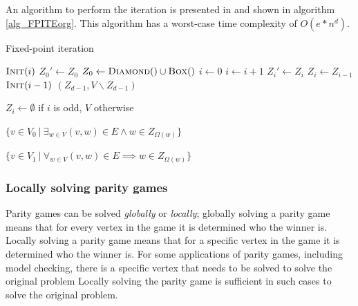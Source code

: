 An algorithm to perform the iteration is presented in \cite{FPITE} and shown in algorithm \ref{alg_FPITEorg}. This algorithm has a worst-case time complexity of $O(e * n ^d)$.
\begin{algorithm}
	\caption{Fixed-point iteration}
	\label{alg_FPITEorg}
	\begin{multicols}{2}
		\begin{algorithmic}[1]
			\State $\textsc{Init}(i)$
			\EndFor
			\Repeat
			\State $Z_0'\gets Z_0$
			\State $Z_0 \gets \textsc{Diamond}() \cup \textsc{Box}()$
			\State $i \gets 0$
			\State $i \gets i+1$
			\State $Z_i' \gets Z_i$
			\State $Z_i \gets Z_{i-1}$
			\State $\textsc{Init}(i-1)$
			\EndWhile
			\State \Return $(Z_{d-1},V\backslash Z_{d-1})$
			\EndFunction
		\end{algorithmic}\bigskip\bigskip
		\begin{algorithmic}[1]
			\Function{Init}{$i$}
			\State $Z_i \gets \emptyset$ if $i$ is odd, $V$ otherwise
			\EndFunction
		\end{algorithmic}\bigskip
		\begin{algorithmic}[1]
			\Function{Diamond}{}
			\State \Return $\{ v \in V_0\ |\ \exists_{w\in V} (v,w) \in E \wedge w \in Z_{\Omega(w)}\}$
			\EndFunction
		\end{algorithmic}\bigskip
		\begin{algorithmic}[1]
			\Function{Box}{}
			\State \Return $\{ v \in V_1\ |\ \forall_{w\in V} (v,w) \in E \implies w \in Z_{\Omega(w)}\}$
			\EndFunction
		\end{algorithmic}
	\end{multicols}
\end{algorithm}

\subsubsection{Locally solving parity games}
Parity games can be solved \textit{globally} or \textit{locally}; globally solving a parity game means that for every vertex in the game it is determined who the winner is. Locally solving a parity game means that for a specific vertex in the game it is determined who the winner is. For some applications of parity games, including model checking, there is a specific vertex that needs to be solved to solve the original problem Locally solving the parity game is sufficient in such cases to solve the original problem.

